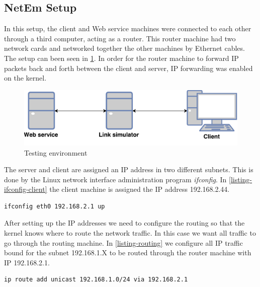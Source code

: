 \subsection{NetEm Setup}

In this setup, the client and Web service machines were connected to each other
through a third computer, acting as a router. This router machine had two
network cards and networked together the other machines by Ethernet cables. The
setup can been seen in \cref{figure-testing-environment}. In order for the
router machine to forward IP packets back and forth between the client and
server, IP forwarding was enabled on the kernel.

\begin{figure}[h]
\includegraphics[scale=0.6]{images/testing_environment.pdf}
\caption{Testing environment}
\label{figure-testing-environment}
\end{figure}

The server and client are assigned an IP address in two different subnets.
This is done by the Linux network interface administration program
\textit{ifconfig}. In \cref{listing-ifconfig-client} the client machine is
assigned the IP address 192.168.2.44.

\begin{lstlisting}[frame=single, caption="Configuring a network interface of the router", label=listing-ifconfig-client]
ifconfig eth0 192.168.2.1 up
\end{lstlisting}

After setting up the IP addresses we need to configure the routing so that the
kernel knows where to route the network traffic. In this case we want all
traffic to go through the routing machine. In \cref{listing-routing} we
configure all IP traffic bound for the subnet 192.168.1.X to be routed through
the router machine with IP 192.168.2.1.

\begin{lstlisting}[frame=single, caption="Configuring routing rules for the client", label=listing-routing]
ip route add unicast 192.168.1.0/24 via 192.168.2.1
\end{lstlisting}

